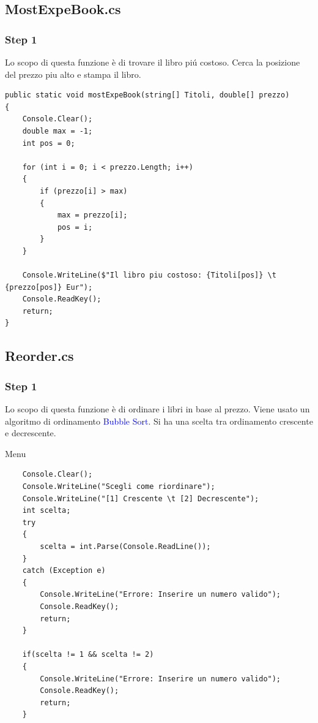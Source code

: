 \documentclass[a4paper,12pt]{article}
\begin{document}
\newpage

\subsection{MostExpeBook.cs}
\subsubsection{Step 1}

Lo scopo di questa funzione è di trovare il libro piú costoso.
Cerca la posizione del prezzo piu alto e stampa il libro.

\begin{lstlisting}
public static void mostExpeBook(string[] Titoli, double[] prezzo)
{
    Console.Clear();
    double max = -1;
    int pos = 0;

    for (int i = 0; i < prezzo.Length; i++)
    {
        if (prezzo[i] > max)
        {
            max = prezzo[i];
            pos = i;
        }
    }

    Console.WriteLine($"Il libro piu costoso: {Titoli[pos]} \t {prezzo[pos]} Eur");
    Console.ReadKey();
    return;
}
\end{lstlisting}

\newpage

\subsection{Reorder.cs}
\subsubsection{Step 1}
Lo scopo di questa funzione è di ordinare i libri in base al prezzo.
Viene usato un algoritmo di ordinamento \textcolor{blue}{Bubble Sort}.
Si ha una scelta tra ordinamento crescente e decrescente.

Menu
\begin{lstlisting}
    Console.Clear();
    Console.WriteLine("Scegli come riordinare");
    Console.WriteLine("[1] Crescente \t [2] Decrescente");
    int scelta;
    try
    {
        scelta = int.Parse(Console.ReadLine());
    }
    catch (Exception e)
    {
        Console.WriteLine("Errore: Inserire un numero valido");
        Console.ReadKey();
        return;
    }

    if(scelta != 1 && scelta != 2)
    {
        Console.WriteLine("Errore: Inserire un numero valido");
        Console.ReadKey();
        return;
    }
\end{lstlisting}
\end{document}
